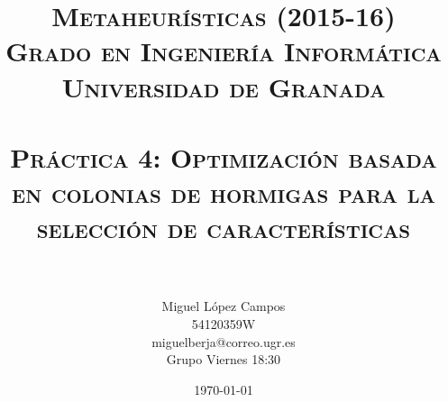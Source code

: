 

\title{
\normalfont \normalsize 
\textsc{{\bf Metaheurísticas (2015-16) \\ Grado en Ingeniería Informática \\ Universidad de Granada} \\ [25pt] %
\horrule{0.5pt} \\[0.4cm] %
\huge Práctica 4: Optimización basada en colonias de hormigas para la selección de características\\ %
\horrule{2pt} \\[0.5cm] %
}}
\author{Miguel López Campos\\ 54120359W\\ miguelberja@correo.ugr.es\\ Grupo Viernes 18:30} %


\date{\normalsize\today} %


	
	\maketitle %
	\newpage %
	
	\tableofcontents %
	\listoffigures

	
	\newpage
	
	\
	
	
	
